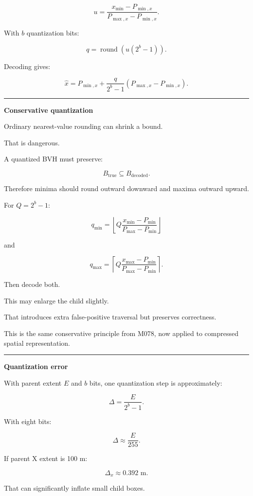 \[
u=
\frac{x_{\min}-P_{\min,x}}
{P_{\max,x}-P_{\min,x}}.
\]

With \(b\) quantization bits:

\[
q=
\operatorname{round}
\left(
u(2^b-1)
\right).
\]

Decoding gives:

\[
\hat x=
P_{\min,x}
+
\frac{q}{2^b-1}
(P_{\max,x}-P_{\min,x}).
\]

\begin{center}\rule{0.5\linewidth}{0.5pt}\end{center}

\textbf{Conservative quantization}

Ordinary nearest-value rounding can shrink a bound.

That is dangerous.

A quantized BVH must preserve:

\[
B_{\text{true}}\subseteq B_{\text{decoded}}.
\]

Therefore minima should round outward downward and maxima outward upward.

For \(Q=2^b-1\):

\[
q_{\min}
=
\left\lfloor
Q
\frac{x_{\min}-P_{\min}}
{P_{\max}-P_{\min}}
\right\rfloor
\]

and

\[
q_{\max}
=
\left\lceil
Q
\frac{x_{\max}-P_{\min}}
{P_{\max}-P_{\min}}
\right\rceil.
\]

Then decode both.

This may enlarge the child slightly.

That introduces extra false-positive traversal but preserves correctness.

This is the same conservative principle from M078, now applied to compressed spatial representation.

\begin{center}\rule{0.5\linewidth}{0.5pt}\end{center}

\textbf{Quantization error}

With parent extent \(E\) and \(b\) bits, one quantization step is approximately:

\[
\Delta=
\frac{E}{2^b-1}.
\]

With eight bits:

\[
\Delta\approx \frac{E}{255}.
\]

If parent X extent is 100 m:

\[
\Delta_x\approx0.392\text{ m}.
\]

That can significantly inflate small child boxes.


